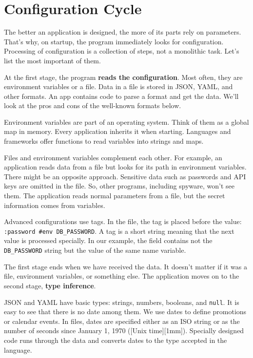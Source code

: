 \label{feature-flags}

\section{Configuration Cycle}

The better an application is designed, the more of its parts rely on parameters. That's why, on startup, the program immediately looks for configuration. Processing of configuration is a collection of steps, not a monolithic task. Let's list the most important of them.

At the first stage, the program \textbf{reads the configuration}. Most often, they are environment variables or a file. Data in a file is stored in JSON, YAML, and other formats. An app contains code to parse a format and get the data. We'll look at the pros and cons of the well-known formats below.

Environment variables are part of an operating system. Think of them as a global map in memory. Every application inherits it when starting. Languages and frameworks offer functions to read variables into strings and maps.

Files and environment variables complement each other. For example, an application reads data from a file but looks for its path in environment variables. There might be an opposite approach. Sensitive data such as passwords and API keys are omitted in the file. So, other programs, including spyware, won't see them. The application reads normal parameters from a file, but the secret information comes from variables.


Advanced configurations use tags. In the file, the tag is placed before the value: \verb|:password #env DB_PASSWORD|. A tag is a short string meaning that the next value is processed specially. In our example, the  field contains not the \verb|DB_PASSWORD| string but the value of the same name variable.

The first stage ends when we have received the data. It doesn't matter if it was a file, environment variables, or something else. The application moves on to the second stage, \textbf{type inference}.


JSON and YAML have basic types: strings, numbers, booleans, and \verb|null|. It is easy to see that there is no date among them. We use dates to define promotions or calendar events. In files, dates are specified either as an ISO string or as the number of seconds since January 1, 1970 ([Unix time][1mm]). Specially designed code runs through the data and converts dates to the type accepted in the language.

